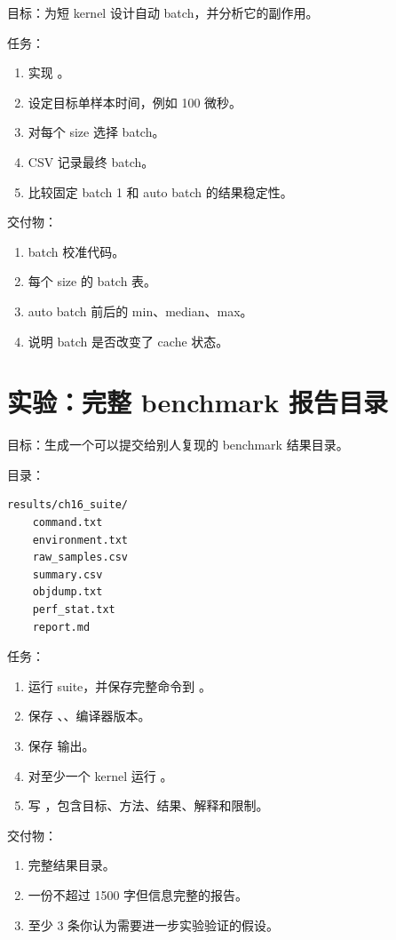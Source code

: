 \begin{labbox}
目标：为短 kernel 设计自动 batch，并分析它的副作用。

任务：

\begin{enumerate}
  \item 实现 。
  \item 设定目标单样本时间，例如 100 微秒。
  \item 对每个 size 选择 batch。
  \item CSV 记录最终 batch。
  \item 比较固定 batch 1 和 auto batch 的结果稳定性。
\end{enumerate}

交付物：

\begin{enumerate}
  \item batch 校准代码。
  \item 每个 size 的 batch 表。
  \item auto batch 前后的 min、median、max。
  \item 说明 batch 是否改变了 cache 状态。
\end{enumerate}
\end{labbox}

\section{实验：完整 benchmark 报告目录}

\begin{labbox}
目标：生成一个可以提交给别人复现的 benchmark 结果目录。

目录：

\begin{lstlisting}
results/ch16_suite/
    command.txt
    environment.txt
    raw_samples.csv
    summary.csv
    objdump.txt
    perf_stat.txt
    report.md
\end{lstlisting}

任务：

\begin{enumerate}
  \item 运行 suite，并保存完整命令到 。
  \item 保存 、、编译器版本。
  \item 保存  输出。
  \item 对至少一个 kernel 运行 。
  \item 写 ，包含目标、方法、结果、解释和限制。
\end{enumerate}

交付物：

\begin{enumerate}
  \item 完整结果目录。
  \item 一份不超过 1500 字但信息完整的报告。
  \item 至少 3 条你认为需要进一步实验验证的假设。
\end{enumerate}
\end{labbox}

